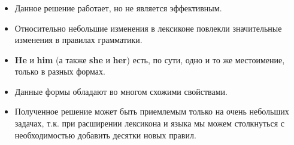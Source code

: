 

\begin{frame}

	\frametitle{\insertsection}
	\framesubtitle{\insertsubsection}
	
	\begin{itemize}
		\item Данное решение работает, но не является эффективным.
		\item Относительно небольшие изменения в лексиконе повлекли значительные изменения в правилах грамматики.
		\item \textbf{He} и \textbf{him} (а также \textbf{she} и \textbf{her}) есть, по сути, одно и то же местоимение, только в разных формах.
		\item Данные формы обладают во многом схожими свойствами.
		\item Полученное решение может быть приемлемым только на очень небольших задачах, т.к. при расширении лексикона и языка мы можем столкнуться с
		необходимостью добавить десятки новых правил.
	\end{itemize}

\end{frame}



